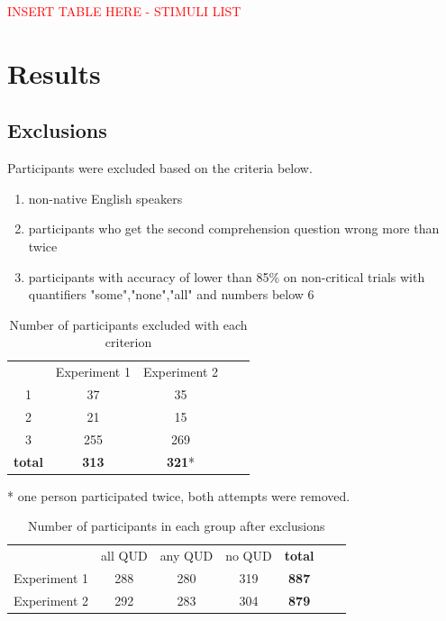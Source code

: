 \documentclass[12pt]{article}
\begin{document}
\begin{center}\textcolor{red}{INSERT TABLE HERE - STIMULI LIST}\end{center}

\pagebreak
\section{Results}

\subsection*{Exclusions}
Participants were excluded based on the criteria below. 

\begin{enumerate}[noitemsep]
\item non-native English speakers 
\item participants who get the second comprehension question wrong more than twice 
\item participants with accuracy of lower than 85\% on non-critical trials with quantifiers "some","none","all" and numbers below 6
\end{enumerate}

\begin{table}[h]
    \centering
    \caption {Number of participants excluded with each criterion}
    \begin{tabular}{ccccc}
    & Experiment 1 & Experiment 2 \\
    1 & 37 & 35 \\
    2 & 21 & 15 \\
    3 & 255 & 269 \\
    \textbf{total} & \textbf{313} & \textbf{321}* \\
    \end{tabular} 
\end{table}
\vspace{-6mm}
* one person participated twice, both attempts were removed.

\medskip

\begin{table}[h]
    \centering
    \caption {Number of participants in each group after exclusions}
    \begin{tabular}{ccccccc}
    & all QUD & any QUD & no QUD & \textbf{total}\\
    Experiment 1 & 288 & 280 & 319 & \textbf{887}\\
    Experiment 2 & 292 & 283 & 304 & \textbf{879}\\
    \end{tabular}
\end{table}
\end{document}
